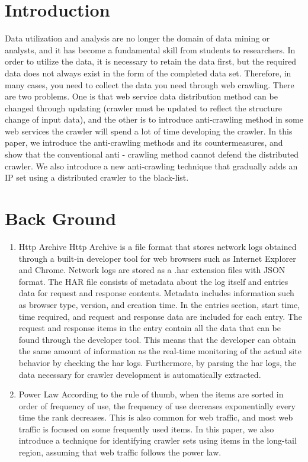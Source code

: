 %
%
\section{Introduction}
Data utilization and analysis are no longer the domain of data mining or analysts, and it has become a fundamental skill from students to researchers. 
In order to utilize the data, it is necessary to retain the data first, but the required data does not always exist in the form of the completed data set. Therefore, in many cases, you need to collect the data you need through web crawling.
There are two problems. One is that web service data distribution method can be changed through updating (crawler must be updated to reflect the structure change of input data), and the other is to introduce anti-crawling method in some web services the crawler will spend a lot of time developing the crawler.
In this paper, we introduce the anti-crawling methods and its countermeasures, and show that the conventional anti - crawling method cannot defend the distributed crawler. We also introduce a new anti-crawling technique that gradually adds an IP set using a distributed crawler to the black-list.



%
%
\section{Back Ground}
\begin{enumerate}
\item Http Archive
\newline Http Archive is a file format that stores network logs obtained through a built-in developer tool for web browsers such as Internet Explorer and Chrome. Network logs are stored as a .har extension files with JSON format. The HAR file consists of metadata about the log itself and entries data for request and response contents. Metadata includes information such as browser type, version, and creation time. In the entries section, start time, time required, and request and response data are included for each entry.
The request and response items in the entry contain all the data that can be found through the developer tool. This means that the developer can obtain the same amount of information as the real-time monitoring of the actual site behavior by checking the har logs. Furthermore, by parsing the har logs, the data necessary for crawler development is automatically extracted.
\newline
\item Power Law
\newline 
According to the rule of thumb, when the items are sorted in order of frequency of use, the frequency of use decreases exponentially every time the rank decreases. This is also common for web traffic, and most web traffic is focused on some frequently used items. In this paper, we also introduce a technique for identifying crawler sets using items in the long-tail region, assuming that web traffic follows the power law.
\end{enumerate}



